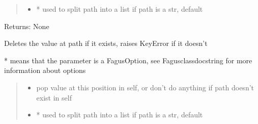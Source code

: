 \documentclass[a4paper,10pt,english]{sphinxmanual}
\begin{document}
\begin{fulllineitems}
\begin{fulllineitems}
\begin{quote}
\begin{description}
\begin{itemize}
\item {}
\sphinxAtStartPar
{} \textendash{} * used to split path into a list if path is a str, default 

\end{itemize}

\end{description}\end{quote}

\sphinxAtStartPar
Returns: None

\end{fulllineitems}


\begin{fulllineitems}
\label{\detokenize{fagus.fagus:fagus.fagus.Fagus.remove}}
\pysigstartsignatures
{}
\pysigstopsignatures
\sphinxAtStartPar
Deletes the value at path if it exists, raises KeyError if it doesn’t

\sphinxAtStartPar
* means that the parameter is a FagusOption, see Fagus\sphinxhyphen{}class\sphinxhyphen{}docstring for more information about options
\begin{quote}\begin{description}
\begin{itemize}
\item {}
\sphinxAtStartPar
{} \textendash{} pop value at this position in self, or don’t do anything if path doesn’t exist in self

\item {}
\sphinxAtStartPar
{} \textendash{} * used to split path into a list if path is a str, default 

\end{itemize}

\end{description}\end{quote}


\end{fulllineitems}
\end{fulllineitems}
\end{document}
